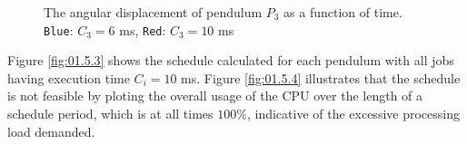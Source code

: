 \begin{figure}[H]\centering
  \scalebox{1}{}
  \caption{The angular displacement of pendulum $P_3$ as a function of time.
    \texttt{Blue}: $C_3 = 6$ ms, \texttt{Red}: $C_3 = 10$ ms}
  \label{fig:01.5.6_10.3}
\end{figure}

Figure \ref{fig:01.5.3} shows the schedule calculated for each pendulum with all
jobs having execution time $C_i = 10$ ms.  Figure \ref{fig:01.5.4} illustrates
that the schedule is not feasible by ploting the overall usage of the CPU over
the length of a schedule period, which is at all times $100\%$, indicative of
the excessive processing load demanded.


\noindent{}
